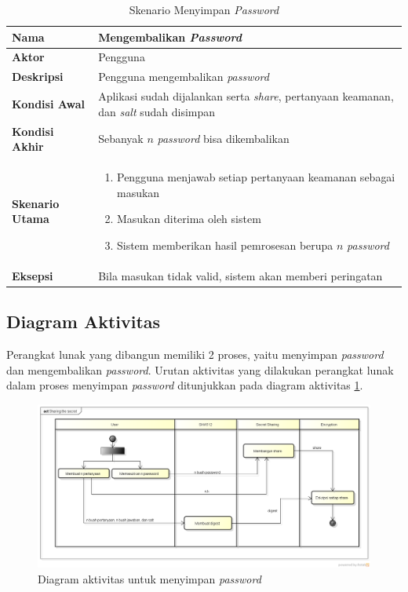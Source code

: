 \begin{table}[H]
	\centering
	\caption{Skenario Menyimpan \textit{Password}} \label{table:scenario1}
	\begin{tabular}{|l|p{12cm}|}
		\hline
		\textbf{Nama} 					& Mengembalikan \textit{Password} 																									\\ \hline
		\textbf{Aktor}					& Pengguna																																					\\ \hline
		\textbf{Deskripsi} 			& Pengguna mengembalikan \textit{password} 																					\\ \hline
		\textbf{Kondisi Awal} 	& Aplikasi sudah dijalankan	serta \textit{share}, pertanyaan keamanan, dan \textit{salt} sudah disimpan  \\ \hline
		\textbf{Kondisi Akhir}	& Sebanyak $n$ \textit{password} bisa dikembalikan																	\\ \hline
		\textbf{Skenario Utama} & \begin{enumerate}[itemsep=0mm]\item Pengguna menjawab setiap pertanyaan keamanan sebagai masukan \item Masukan diterima oleh sistem \item Sistem memberikan hasil pemrosesan berupa $n$ \textit{password}\end{enumerate} \\ \hline
		\textbf{Eksepsi}				& Bila masukan tidak valid, sistem akan memberi peringatan \\ \hline
	\end{tabular}
\end{table}

\subsection{Diagram Aktivitas}

Perangkat lunak yang dibangun memiliki 2 proses, yaitu menyimpan \textit{password} dan mengembalikan \textit{password}. Urutan aktivitas yang dilakukan perangkat lunak dalam proses menyimpan \textit{password} ditunjukkan pada diagram aktivitas \ref{fig:activity1}.

\begin{figure}[H]
	\centerline{\includegraphics[scale=0.4]{Gambar/sharing-secret}}
	\caption{Diagram aktivitas untuk menyimpan \textit{password}}\label{fig:activity1}
\end{figure}

